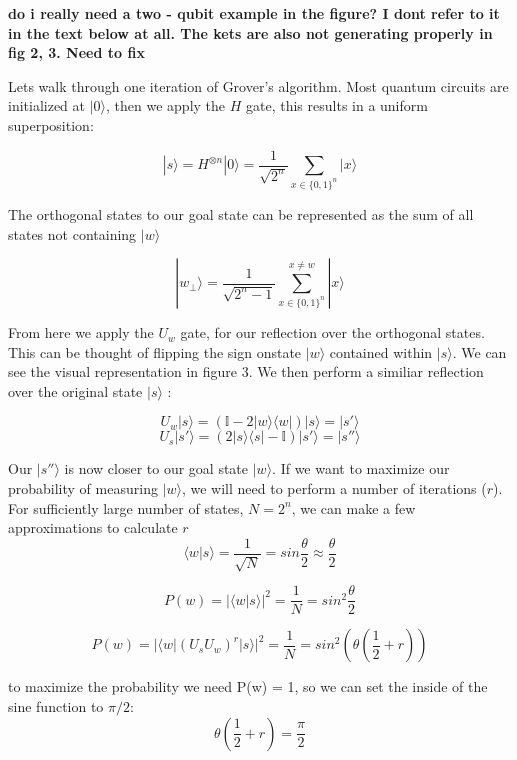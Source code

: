\documentclass[twocolumn,showpacs,preprintnumbers,amsmath,amssymb]{revtex4}
\begin{document}
		
		\textbf{do i really need a two - qubit example in the figure? I dont refer to it in the text below at all. The kets are also not generating properly in fig 2, 3. Need to fix}
		
		Lets walk through one iteration of Grover's algorithm. Most quantum circuits are initialized at $|0\rangle$, then we apply the $H$ gate, this results in a uniform superposition:
		
		$$ |s\rangle = H^{\otimes n} |0 \rangle = \frac{1}{\sqrt{2^n}} \sum_{x\in\{0,1\}^n} |x\rangle$$
		
		
		The orthogonal states  to our goal state can be represented as the sum of all states not containing $|w\rangle$
		
		$$ |w_\perp\rangle=  \frac{1}{\sqrt{2^n -1}} \sum_{x\in\{0,1\}^n}^{x \neq w} |x\rangle$$
		
		From here we apply the $U_w$ gate, for our reflection over the orthogonal states. This can be thought of flipping the sign onstate $|w\rangle$ contained within $|s\rangle$. We can see the visual representation in figure 3. We then perform a similiar reflection over the original state $|s\rangle$ :
		
		$$ U_w|s \rangle	=  (\mathbb {I} - 2|w \rangle \langle w|) |s \rangle = |s'\rangle$$
		$$ U_s|s' \rangle	=  (2|s \rangle \langle s| - \mathbb {I}) |s' \rangle = |s''\rangle$$
		
		Our $|s''\rangle$ is now closer to our goal state $|w\rangle$.  If we want to maximize our probability of measuring  $|w\rangle$, we will need to perform a number of iterations ($r$). For sufficiently large number of states, $N = 2^n$, we can make a few approximations to calculate $r$
		\begin{equation}
			\langle w | s \rangle = \frac{1}{\sqrt{N}} = sin \frac{\theta}{2} \approx \frac{\theta}{2}
		\end{equation}
		
		
		$$P(w) = |\langle w | s \rangle|^2 = \frac{1}{N} = sin^2 \frac{\theta}{2} $$
		
		$$P(w) = |\langle w |(U_sU_w)^r |s \rangle|^2 = \frac{1}{N} = sin^2 (\theta(\frac{1}{2} + r)) $$
		
		to maximize the probability we need P(w) = 1, so we can set the inside of the sine function to $\pi/2$:
		$$ \theta \left(\frac{1}{2} + r \right) = \frac{\pi}{2}$$
		
\end{document}
